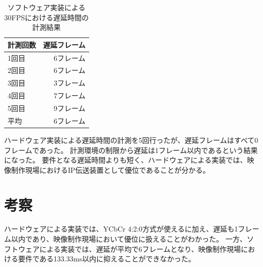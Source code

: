 \begin{table}[htbp]
  \caption{ソフトウェア実装による30FPSにおける遅延時間の計測結果}
  \label{tb:evaluate-software-delay}
  \begin{center}
  \begin{tabular}{l|r}
    \hline
     計測回数 & 遅延フレーム \\\hline\hline
     1回目 & 6フレーム   \\\hline
     2回目 & 6フレーム   \\\hline
     3回目 & 3フレーム   \\\hline
     4回目 & 7フレーム   \\\hline
     5回目 & 9フレーム   \\\hline\hline
      平均 & 6フレーム   \\\hline
  \end{tabular}\end{center}
\end{table}

ハードウェア実装による遅延時間の計測を5回行ったが、遅延フレームはすべて0フレームであった。
計測環境の制限から遅延は1フレーム以内であるという結果になった。
要件となる遅延時間よりも短く、ハードウェアによる実装では、映像制作現場におけるIP伝送装置として優位であることが分かる。


\section{考察}

ハードウェアによる実装では、YCbCr 4:2:0方式が使えるに加え、遅延も1フレーム以内であり、映像制作現場において優位に扱えることがわかった。
一方、ソフトウェアによる実装では、遅延が平均で6フレームとなり、映像制作現場における要件である133.33ms以内に抑えることができなかった。
